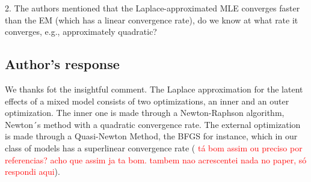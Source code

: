 \documentclass[a4paper,12pt]{article}
\begin{document}
2. The authors mentioned that the Laplace-approximated MLE converges
faster than the EM (which has a linear convergence rate), do we know at
what rate it converges, e.g., approximately quadratic?

\subsection*{Author's response}

We thanks fot the insightful comment. The Laplace approximation for the
latent effects of a mixed model consists of two optimizations, an inner
and an outer optimization. The inner one is made through a
Newton-Raphson algorithm, Newton´s method with a quadratic convergence
rate. The external optimization is made through a Quasi-Newton Method,
the BFGS for instance, which in our class of models has a superlinear
convergence rate ( \textcolor{red}{tá bom assim ou preciso por
                                   referencias? acho que assim ja ta bom.
                                   tambem nao acrescentei nada no paper,
                                   só respondi aqui}).

 
\end{document}
